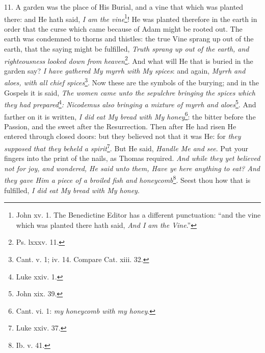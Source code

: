 11. A garden was the place of His Burial, and a vine that which was planted there: and He hath said, \emph{I am the vine}\footnote{John xv. 1. The Benedictine Editor has a different punctuation: “and the vine which was planted there hath said, \emph{And I am the Vine}.”}! He was planted therefore in the earth in order that the curse which came because of Adam might be rooted out. The earth was condemned to thorns and thistles: the true Vine sprang up out of the earth, that the saying might be fulfilled, \emph{Truth sprang up out of the earth, and righteousness} \emph{looked down from heaven}\footnote{Ps. lxxxv. 11.}. And what will He that is buried in the garden say? \emph{I have gathered My myrrh with My spices}: and again, \emph{Myrrh and aloes, with all chief spices}\footnote{Cant. v. 1; iv. 14. Compare Cat. xiii. 32.}. Now these are the symbols of the burying; and in the Gospels it is said, \emph{The women came unto the sepulchre bringing the spices which they had prepared}\footnote{Luke xxiv. 1.}\emph{: Nicodemus also bringing a mixture of myrrh and aloes}\footnote{John xix. 39.}. And farther on it is written, \emph{I did eat My bread with My honey}\footnote{Cant. vi. 1: \emph{my honeycomb with my honey}.}: the bitter before the Passion, and the sweet after the Resurrection. Then after He had risen He entered through closed doors: but they believed not that it was He: for \emph{they supposed that they beheld a spirit}\footnote{Luke xxiv. 37.}. But He said, \emph{Handle Me and see}. Put your fingers into the print of the nails, as Thomas required. \emph{And while they yet believed not for joy, and wondered, He said unto them, Have ye here anything to eat? And they gave Him a piece of a broiled fish and honeycomb}\footnote{Ib. v. 41.}. Seest thou how that is fulfilled, \emph{I did eat My bread with My honey}.

